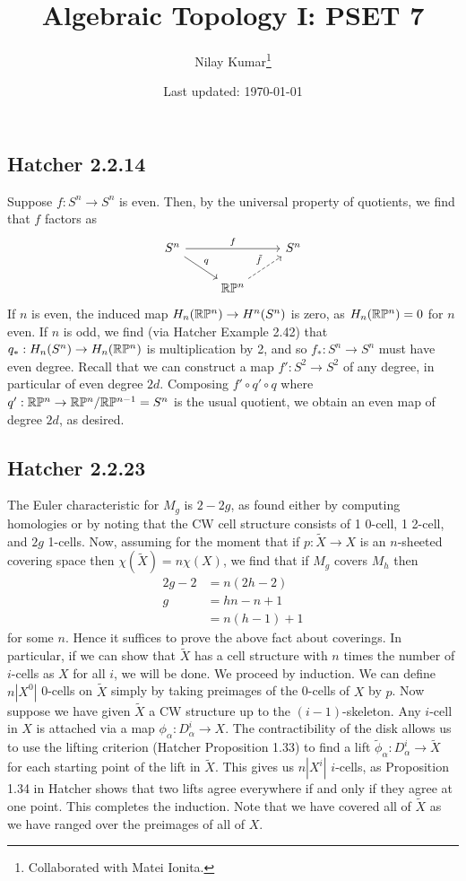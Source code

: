 \documentclass{../mathnotes}
\title{Algebraic Topology I: PSET 7}
\author{Nilay Kumar\footnote{Collaborated with Matei Ionita.}}
\date{Last updated: \today}
\begin{document}
\maketitle

\subsection*{Hatcher 2.2.14}

Suppose $f:S^n\to S^n$ is even. Then, by the universal property of quotients, we find
that $f$ factors as
\begin{equation*}
    \begin{tikzcd}
        S^n\ar{dr}{q}\ar{rr}{f} && S^n\\
        &\RP^n\ar[dashed]{ur}{\tilde f}&
    \end{tikzcd}
\end{equation*}
If $n$ is even, the induced map $H_n(\mathbb{R}\mathbb{P}^n)\to H^n(S^n)$ is zero, as $H_n(\mathbb{R}\mathbb{P}^n)=0$ for
$n$ even.  If $n$ is odd, we find (via Hatcher Example 2.42) that $q_*:H_n(S^n)\to H_n(\mathbb{R}\mathbb{P}^n)$
is multiplication by 2, and so $f_*:S^n\to S^n$ must have even degree. Recall that we can
construct a map $f':S^2\to S^2$ of any degree, in particular of even degree $2d$. Composing
$f'\circ q'\circ q$ where $q':\mathbb{R}\mathbb{P}^n\to \mathbb{R}\mathbb{P}^n/\mathbb{R}\mathbb{P}^{n-1}=S^n$ is the usual quotient,
we obtain an even map of degree $2d$, as desired.

\subsection*{Hatcher 2.2.23}

The Euler characteristic for $M_g$ is $2-2g$, as found either by computing homologies
or by noting that the CW cell structure consists of 1 0-cell, 1 2-cell, and $2g$ 1-cells.
Now, assuming for the moment that if $p:\tilde X\to X$ is an $n$-sheeted covering space
then $\chi(\tilde X)=n\chi(X)$, we find that if $M_g$ covers $M_h$ then
\begin{align*}
    2g-2 &= n(2h-2)\\
    g &= hn-n+1\\
    &= n(h-1)+1
\end{align*}
for some $n$. Hence it suffices to prove the above fact about coverings. In particular,
if we can show that $\tilde X$ has a cell structure with $n$ times the number of $i$-cells
as $X$ for all $i$, we will be done. We proceed by induction. We can define $n|X^0|$ 0-cells 
on $\tilde X$ simply by taking preimages of the 0-cells of $X$ by $p$. Now suppose we have
given $\tilde X$ a CW structure up to the $(i-1)$-skeleton. Any $i$-cell in $X$ is attached via
a map $\phi_\alpha:D^i_\alpha\to X$. The contractibility of the disk allows us to use the
lifting criterion (Hatcher Proposition 1.33) to find a lift $\tilde\phi_\alpha:D^i_\alpha\to\tilde X$
for each starting point of the lift in $\tilde X$. This gives us $n|X^i|$ $i$-cells, as
Proposition 1.34 in Hatcher shows that two lifts agree everywhere if and only if they agree
at one point. This completes the induction. Note that we have covered all of $\tilde X$ as we
have ranged over the preimages of all of $X$.
\end{document}
